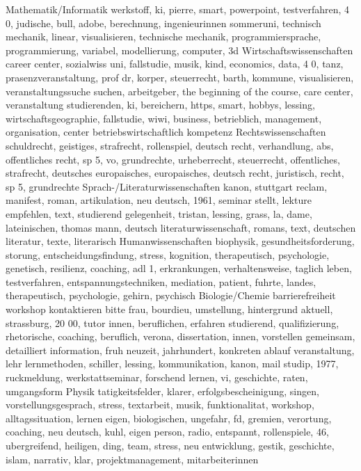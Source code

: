 Mathematik/Informatik               werkstoff, ki, pierre, smart, powerpoint, testverfahren, 4 0, judische, bull, adobe, berechnung, ingenieurinnen sommeruni, technisch mechanik, linear, visualisieren, technische mechanik, programmiersprache, programmierung, variabel, modellierung, computer, 3d
Wirtschaftswissenschaften           career center, sozialwiss uni, fallstudie, musik, kind, economics, data, 4 0, tanz, prasenzveranstaltung, prof dr, korper, steuerrecht, barth, kommune, visualisieren, veranstaltungssuche suchen, arbeitgeber, the beginning of the course, care center, veranstaltung studierenden, ki, bereichern, https, smart, hobbys, lessing, wirtschaftsgeographie, fallstudie, wiwi, business, betrieblich, management, organisation, center betriebswirtschaftlich kompetenz
Rechtswissenschaften                schuldrecht, geistiges, strafrecht, rollenspiel, deutsch recht, verhandlung, abs, offentliches recht, sp 5, vo, grundrechte, urheberrecht, steuerrecht, offentliches, strafrecht, deutsches europaisches, europaisches, deutsch recht, juristisch, recht, sp 5, grundrechte
Sprach-/Literaturwissenschaften     kanon, stuttgart reclam, manifest, roman, artikulation, neu deutsch, 1961, seminar stellt, lekture empfehlen, text, studierend gelegenheit, tristan, lessing, grass, la, dame, lateinischen, thomas mann, deutsch literaturwissenschaft, romans, text, deutschen literatur, texte, literarisch
Humanwissenschaften                 biophysik, gesundheitsforderung, storung, entscheidungsfindung, stress, kognition, therapeutisch, psychologie, genetisch, resilienz, coaching, adl 1, erkrankungen, verhaltensweise, taglich leben, testverfahren, entspannungstechniken, mediation, patient, fuhrte, landes, therapeutisch, psychologie, gehirn, psychisch
Biologie/Chemie                     barrierefreiheit workshop kontaktieren bitte frau, bourdieu, umstellung, hintergrund aktuell, strassburg, 20 00, tutor innen, beruflichen, erfahren studierend, qualifizierung, rhetorische, coaching, beruflich, verona, dissertation, innen, vorstellen gemeinsam, detailliert information, fruh neuzeit, jahrhundert, konkreten ablauf veranstaltung, lehr lernmethoden, schiller, lessing, kommunikation, kanon, mail studip, 1977, ruckmeldung, werkstattseminar, forschend lernen, vi, geschichte, raten, umgangsform
Physik                              tatigkeitsfelder, klarer, erfolgsbescheinigung, singen, vorstellungsgesprach, stress, textarbeit, musik, funktionalitat, workshop, alltagssituation, lernen eigen, biologischen, ungefahr, fd, gremien, verortung, coaching, neu deutsch, kuhl, eigen person, radio, entspannt, rollenspiele, 46, ubergreifend, heiligen, ding, team, stress, neu entwicklung, gestik, geschichte, islam, narrativ, klar, projektmanagement, mitarbeiterinnen
